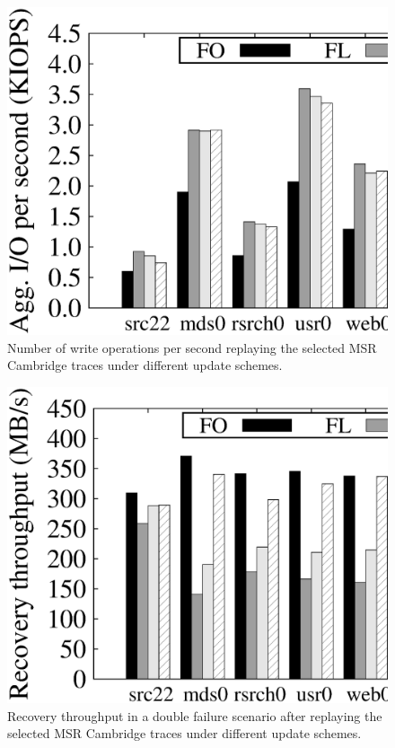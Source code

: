 \begin{figure}[t]
    \centering
    \includegraphics[width=\linewidth]{charts/msr_update/eps/msr_update}
    \vspace{-12pt}
    \caption{Number of write operations per second replaying the selected MSR
        Cambridge traces under different update schemes.}
    \label{fig:msr_update}
\end{figure}

\begin{figure}[t]
    \centering
    \includegraphics[width=\linewidth]{charts/msr_recovery/eps/msr_recovery}
    \vspace{-12pt}
    \caption{Recovery throughput in a double failure scenario after replaying
        the selected MSR Cambridge traces under different update schemes.}
    \label{fig:msr_recovery}
\end{figure}

